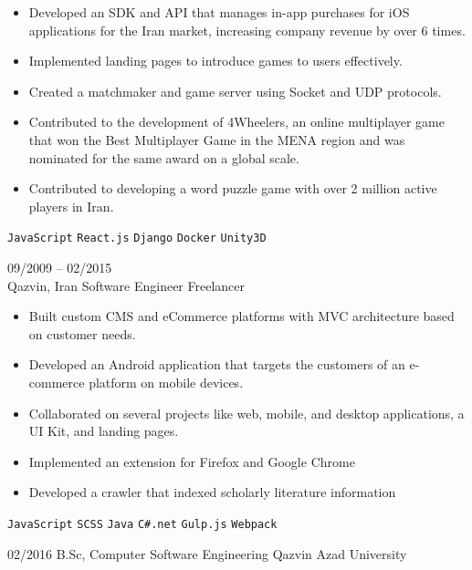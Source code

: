 \documentclass[8pt]{developercv} %
\begin{document}
\begin{entrylist}
{\begin{itemize}[noitemsep,topsep=0pt,parsep=0pt,partopsep=0pt, leftmargin=-1pt]
                \item Developed an SDK and API that manages in-app purchases for iOS applications for the Iran market, increasing company revenue by over 6 times.
                \item Implemented landing pages to introduce games to users effectively.
                \item Created a matchmaker and game server using Socket and UDP protocols.
                \item Contributed to the development of 4Wheelers, an online multiplayer game that won the Best Multiplayer Game in the MENA region and was nominated for the same award on a global scale.
                \item Contributed to developing a word puzzle game with over 2 million active players in Iran.
            \end{itemize}
            \texttt{JavaScript} \slashsep \texttt{React.js} \slashsep \texttt{Django} \slashsep \texttt{Docker} \slashsep \texttt{Unity3D}
        }
        \entry
        {09/2009 -- 02/2015 \\ Qazvin, Iran}
        {Software Engineer}
        {Freelancer}
        {\vspace{-10pt}
            \begin{itemize}[noitemsep,topsep=0pt,parsep=0pt,partopsep=0pt, leftmargin=-1pt]
                \item Built custom CMS and eCommerce platforms with MVC architecture based on customer needs.
                \item Developed an Android application that targets the customers of an e-commerce platform on mobile devices.
                \item Collaborated on several projects like web, mobile, and desktop applications, a UI Kit, and landing pages.
                \item Implemented an extension for Firefox and Google Chrome
                \item Developed a crawler that indexed scholarly literature information
            \end{itemize}
            \texttt{JavaScript} \slashsep \texttt{SCSS} \slashsep \texttt{Java} \slashsep \texttt{C\#.net} \slashsep \texttt{Gulp.js} \slashsep \texttt{Webpack}
        }
    \end{entrylist}

    \vspace{-10 pt}
    \begin{entrylist}
        \entry
        {02/2016}
        {B.Sc, Computer Software Engineering}
        {Qazvin Azad University}
        {}
    \end{entrylist}
\end{document}
